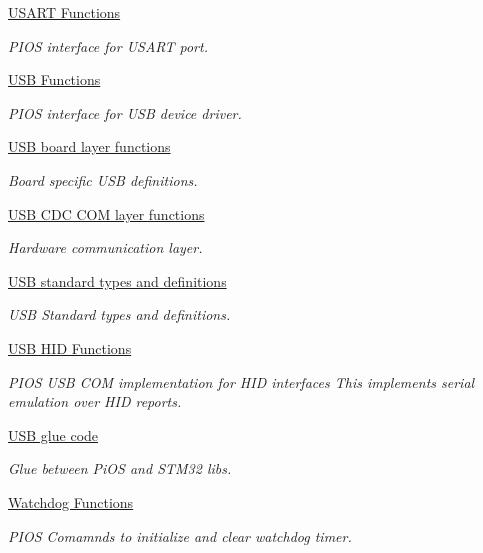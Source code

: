 \begin{DoxyCompactItemize}
\hyperlink{group___p_i_o_s___u_s_a_r_t}{U\-S\-A\-R\-T Functions}
\begin{DoxyCompactList}\small\item\em P\-I\-O\-S interface for U\-S\-A\-R\-T port. \end{DoxyCompactList}\item 
\hyperlink{group___p_i_o_s___u_s_b}{U\-S\-B Functions}
\begin{DoxyCompactList}\small\item\em P\-I\-O\-S interface for U\-S\-B device driver. \end{DoxyCompactList}\item 
\hyperlink{group___p_i_o_s___u_s_b___b_o_a_r_d}{U\-S\-B board layer functions}
\begin{DoxyCompactList}\small\item\em Board specific U\-S\-B definitions. \end{DoxyCompactList}\item 
\hyperlink{group___p_i_o_s___u_s_b___c_o_m}{U\-S\-B C\-D\-C C\-O\-M layer functions}
\begin{DoxyCompactList}\small\item\em Hardware communication layer. \end{DoxyCompactList}\item 
\hyperlink{group___p_i_o_s___u_s_b___d_e_f_s}{U\-S\-B standard types and definitions}
\begin{DoxyCompactList}\small\item\em U\-S\-B Standard types and definitions. \end{DoxyCompactList}\item 
\hyperlink{group___p_i_o_s___u_s_b___h_i_d}{U\-S\-B H\-I\-D Functions}
\begin{DoxyCompactList}\small\item\em P\-I\-O\-S U\-S\-B C\-O\-M implementation for H\-I\-D interfaces  This implements serial emulation over H\-I\-D reports. \end{DoxyCompactList}\item 
\hyperlink{group___p_i_o_s___u_s_b_h_o_o_k}{U\-S\-B glue code}
\begin{DoxyCompactList}\small\item\em Glue between Pi\-O\-S and S\-T\-M32 libs. \end{DoxyCompactList}\item 
\hyperlink{group___p_i_o_s___w_d_g}{Watchdog Functions}
\begin{DoxyCompactList}\small\item\em P\-I\-O\-S Comamnds to initialize and clear watchdog timer. \end{DoxyCompactList}\item 

\end{DoxyCompactItemize}
